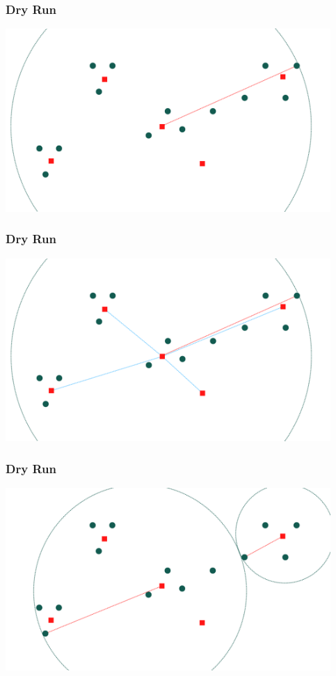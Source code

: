 \documentclass{beamer}
\begin{document}
\begin{frame}[c]
    \frametitle{Dry Run}
    \centering \includegraphics[width=350pt]{./6.png}
\end{frame}

\begin{frame}[c]
    \frametitle{Dry Run}
    \centering \includegraphics[width=350pt]{./7.png}
\end{frame}
   
\begin{frame}[c]
    \frametitle{Dry Run}
    \centering \includegraphics[width=350pt]{./8.png}
\end{frame}   
\end{document}
